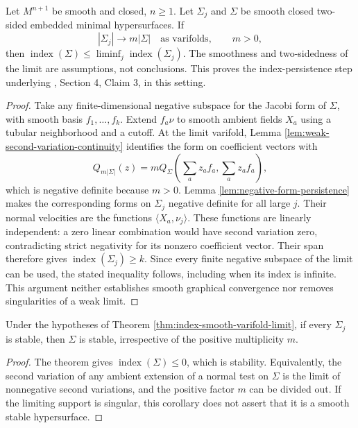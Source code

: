 \begin{theorem}\label{thm:index-smooth-varifold-limit}
Let $M^{n+1}$ be smooth and closed, $n\geq1$. Let $\Sigma_j$ and $\Sigma$ be smooth closed two-sided embedded minimal hypersurfaces. If
\[
 |\Sigma_j|\longrightarrow m|\Sigma|\quad\text{as varifolds},\qquad m>0,
\]
then $\operatorname{index}(\Sigma)\leq\liminf_j\operatorname{index}(\Sigma_j)$. The smoothness and two-sidedness of the limit are assumptions, not conclusions. This proves the index-persistence step underlying \cite{Sharp17}, Section 4, Claim 3, in this setting.
\end{theorem}
\begin{proof}
Take any finite-dimensional negative subspace for the Jacobi form of $\Sigma$, with smooth basis $f_1,\ldots,f_k$. Extend $f_a\nu$ to smooth ambient fields $X_a$ using a tubular neighborhood and a cutoff. At the limit varifold, Lemma \ref{lem:weak-second-variation-continuity} identifies the form on coefficient vectors with
\[
 Q_{m|\Sigma|}(z)=mQ_\Sigma\left(\sum_a z_af_a,\sum_a z_af_a\right),
\]
which is negative definite because $m>0$. Lemma \ref{lem:negative-form-persistence} makes the corresponding forms on $\Sigma_j$ negative definite for all large $j$. Their normal velocities are the functions $\langle X_a,\nu_j\rangle$. These functions are linearly independent: a zero linear combination would have second variation zero, contradicting strict negativity for its nonzero coefficient vector. Their span therefore gives $\operatorname{index}(\Sigma_j)\geq k$. Since every finite negative subspace of the limit can be used, the stated inequality follows, including when its index is infinite. This argument neither establishes smooth graphical convergence nor removes singularities of a weak limit.
\end{proof}

\begin{corollary}\label{cor:stable-smooth-varifold-limit}
Under the hypotheses of Theorem \ref{thm:index-smooth-varifold-limit}, if every $\Sigma_j$ is stable, then $\Sigma$ is stable, irrespective of the positive multiplicity $m$.
\end{corollary}
\begin{proof}
The theorem gives $\operatorname{index}(\Sigma)\leq0$, which is stability. Equivalently, the second variation of any ambient extension of a normal test on $\Sigma$ is the limit of nonnegative second variations, and the positive factor $m$ can be divided out. If the limiting support is singular, this corollary does not assert that it is a smooth stable hypersurface.
\end{proof}

